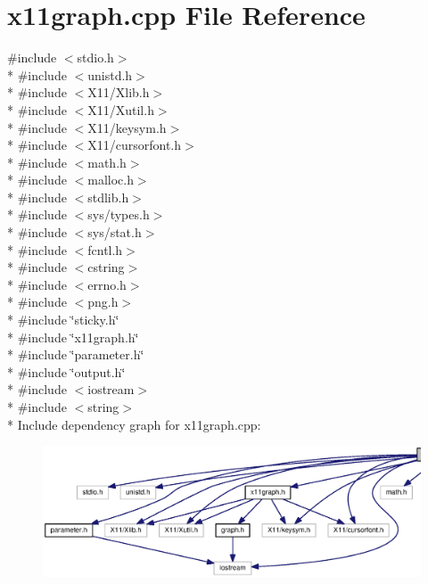 \section{x11graph.\-cpp File Reference}
\label{x11graph_8cpp}
{\ttfamily \#include $<$stdio.\-h$>$}\\*
{\ttfamily \#include $<$unistd.\-h$>$}\\*
{\ttfamily \#include $<$X11/\-Xlib.\-h$>$}\\*
{\ttfamily \#include $<$X11/\-Xutil.\-h$>$}\\*
{\ttfamily \#include $<$X11/keysym.\-h$>$}\\*
{\ttfamily \#include $<$X11/cursorfont.\-h$>$}\\*
{\ttfamily \#include $<$math.\-h$>$}\\*
{\ttfamily \#include $<$malloc.\-h$>$}\\*
{\ttfamily \#include $<$stdlib.\-h$>$}\\*
{\ttfamily \#include $<$sys/types.\-h$>$}\\*
{\ttfamily \#include $<$sys/stat.\-h$>$}\\*
{\ttfamily \#include $<$fcntl.\-h$>$}\\*
{\ttfamily \#include $<$cstring$>$}\\*
{\ttfamily \#include $<$errno.\-h$>$}\\*
{\ttfamily \#include $<$png.\-h$>$}\\*
{\ttfamily \#include \char`\"{}sticky.\-h\char`\"{}}\\*
{\ttfamily \#include \char`\"{}x11graph.\-h\char`\"{}}\\*
{\ttfamily \#include \char`\"{}parameter.\-h\char`\"{}}\\*
{\ttfamily \#include \char`\"{}output.\-h\char`\"{}}\\*
{\ttfamily \#include $<$iostream$>$}\\*
{\ttfamily \#include $<$string$>$}\\*
Include dependency graph for x11graph.\-cpp\-:
\nopagebreak
\begin{figure}[H]
\begin{center}
\leavevmode
\includegraphics[width=350pt]{x11graph_8cpp__incl}
\end{center}
\end{figure}

